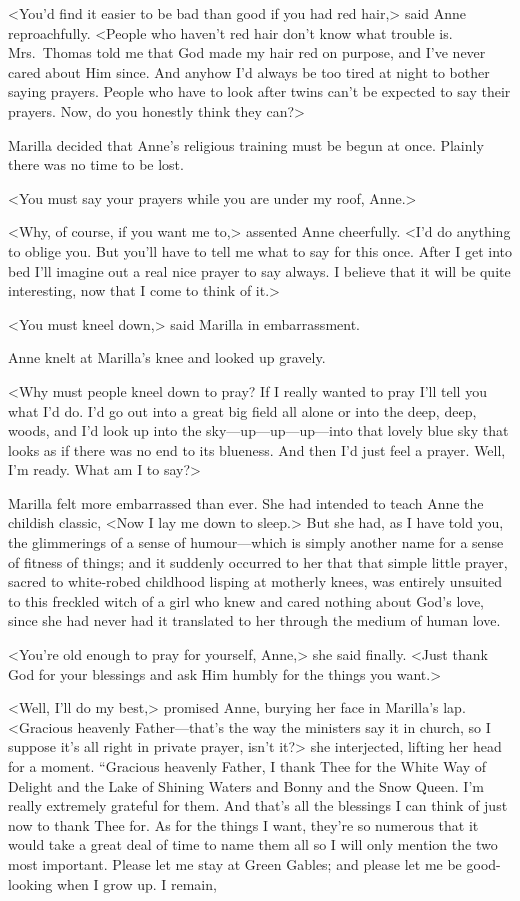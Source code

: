 <You'd find it easier to be bad than good if you had red hair,> said Anne reproachfully. <People who haven't red hair don't know what trouble is. Mrs.~Thomas told me that God made my hair red on purpose, and I've never cared about Him since. And anyhow I'd always be too tired at night to bother saying prayers. People who have to look after twins can't be expected to say their prayers. Now, do you honestly think they can?>

Marilla decided that Anne's religious training must be begun at once. Plainly there was no time to be lost.

<You must say your prayers while you are under my roof, Anne.>

<Why, of course, if you want me to,> assented Anne cheerfully. <I'd do anything to oblige you. But you'll have to tell me what to say for this once. After I get into bed I'll imagine out a real nice prayer to say always. I believe that it will be quite interesting, now that I come to think of it.>

<You must kneel down,> said Marilla in embarrassment.

Anne knelt at Marilla's knee and looked up gravely.

<Why must people kneel down to pray? If I really wanted to pray I'll tell you what I'd do. I'd go out into a great big field all alone or into the deep, deep, woods, and I'd look up into the sky—up—up—up—into that lovely blue sky that looks as if there was no end to its blueness. And then I'd just feel a prayer. Well, I'm ready. What am I to say?>

Marilla felt more embarrassed than ever. She had intended to teach Anne the childish classic, <Now I lay me down to sleep.> But she had, as I have told you, the glimmerings of a sense of humour—which is simply another name for a sense of fitness of things; and it suddenly occurred to her that that simple little prayer, sacred to white-robed childhood lisping at motherly knees, was entirely unsuited to this freckled witch of a girl who knew and cared nothing about God's love, since she had never had it translated to her through the medium of human love.

<You're old enough to pray for yourself, Anne,> she said finally. <Just thank God for your blessings and ask Him humbly for the things you want.>

<Well, I'll do my best,> promised Anne, burying her face in Marilla's lap. <Gracious heavenly Father—that's the way the ministers say it in church, so I suppose it's all right in private prayer, isn't it?> she interjected, lifting her head for a moment. “Gracious heavenly Father, I thank Thee for the White Way of Delight and the Lake of Shining Waters and Bonny and the Snow Queen. I'm really extremely grateful for them. And that's all the blessings I can think of just now to thank Thee for. As for the things I want, they're so numerous that it would take a great deal of time to name them all so I will only mention the two most important. Please let me stay at Green Gables; and please let me be good-looking when I grow up. I remain,

